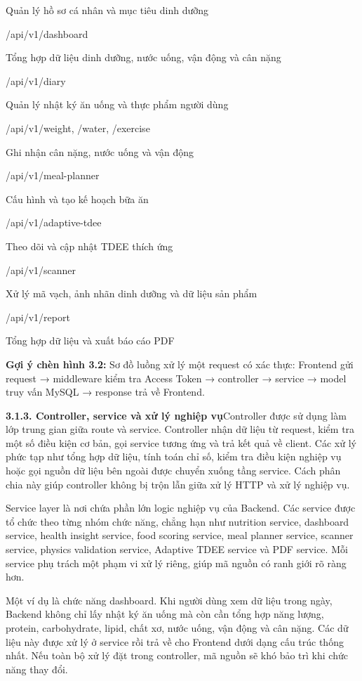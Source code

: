 Quản lý hồ sơ cá nhân và mục tiêu dinh dưỡng

/api/v1/dashboard

Tổng hợp dữ liệu dinh dưỡng, nước uống, vận động và cân nặng

/api/v1/diary

Quản lý nhật ký ăn uống và thực phẩm người dùng

/api/v1/weight, /water, /exercise

Ghi nhận cân nặng, nước uống và vận động

/api/v1/meal-planner

Cấu hình và tạo kế hoạch bữa ăn

/api/v1/adaptive-tdee

Theo dõi và cập nhật TDEE thích ứng

/api/v1/scanner

Xử lý mã vạch, ảnh nhãn dinh dưỡng và dữ liệu sản phẩm

/api/v1/report

Tổng hợp dữ liệu và xuất báo cáo PDF

\textbf{Gợi ý chèn hình 3.2:} Sơ đồ luồng xử lý một request có xác thực: Frontend gửi request → middleware kiểm tra Access Token → controller → service → model truy vấn MySQL → response trả về Frontend.

\textbf{3.1.3. Controller, service và xử lý nghiệp vụ}Controller được sử dụng làm lớp trung gian giữa route và service. Controller nhận dữ liệu từ request, kiểm tra một số điều kiện cơ bản, gọi service tương ứng và trả kết quả về client. Các xử lý phức tạp như tổng hợp dữ liệu, tính toán chỉ số, kiểm tra điều kiện nghiệp vụ hoặc gọi nguồn dữ liệu bên ngoài được chuyển xuống tầng service. Cách phân chia này giúp controller không bị trộn lẫn giữa xử lý HTTP và xử lý nghiệp vụ.

Service layer là nơi chứa phần lớn logic nghiệp vụ của Backend. Các service được tổ chức theo từng nhóm chức năng, chẳng hạn như nutrition service, dashboard service, health insight service, food scoring service, meal planner service, scanner service, physics validation service, Adaptive TDEE service và PDF service. Mỗi service phụ trách một phạm vi xử lý riêng, giúp mã nguồn có ranh giới rõ ràng hơn.

Một ví dụ là chức năng dashboard. Khi người dùng xem dữ liệu trong ngày, Backend không chỉ lấy nhật ký ăn uống mà còn cần tổng hợp năng lượng, protein, carbohydrate, lipid, chất xơ, nước uống, vận động và cân nặng. Các dữ liệu này được xử lý ở service rồi trả về cho Frontend dưới dạng cấu trúc thống nhất. Nếu toàn bộ xử lý đặt trong controller, mã nguồn sẽ khó bảo trì khi chức năng thay đổi.

